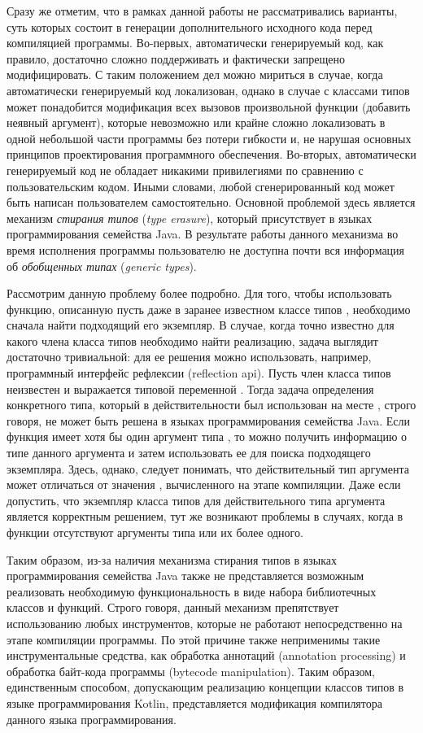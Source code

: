 Сразу же отметим, что в рамках данной работы не рассматривались варианты, суть которых состоит в генерации дополнительного исходного кода перед компиляцией программы. Во-первых, автоматически генерируемый код, как правило, достаточно сложно поддерживать и фактически запрещено модифицировать. С таким положением дел можно мириться в случае, когда автоматически генерируемый код локализован, однако в случае с классами типов может понадобится модификация всех вызовов произвольной функции (добавить неявный аргумент), которые невозможно или крайне сложно локализовать в одной небольшой части программы без потери гибкости и, не нарушая основных принципов проектирования программного обеспечения. Во-вторых, автоматически генерируемый код не обладает никакими привилегиями по сравнению с пользовательским кодом. Иными словами, любой сгенерированный код может быть написан пользователем самостоятельно. Основной проблемой здесь является механизм \emph{стирания типов} (\emph{type erasure}), который присутствует в языках программирования семейства Java. В результате работы данного механизма во время исполнения программы пользователю не доступна почти вся информация об \emph{обобщенных типах} (\emph{generic types}). 

Рассмотрим данную проблему более подробно. Для того, чтобы использовать функцию, описанную пусть даже в заранее известном классе типов , необходимо сначала найти подходящий его экземпляр. В случае, когда точно известно для какого члена класса типов  необходимо найти реализацию, задача выглядит достаточно тривиальной: для ее решения можно использовать, например, программный интерфейс рефлексии (reflection api). Пусть член класса типов неизвестен и выражается типовой переменной . Тогда задача определения конкретного типа, который в действительности был использован на месте , строго говоря, не может быть решена в языках программирования семейства Java. Если функция имеет хотя бы один аргумент типа , то можно получить информацию о типе данного аргумента и затем использовать ее для поиска подходящего экземпляра. Здесь, однако, следует понимать, что действительный тип аргумента может отличаться от значения , вычисленного на этапе компиляции. Даже если допустить, что экземпляр класса типов для действительного типа аргумента является корректным решением, тут же возникают проблемы в случаях, когда в функции отсутствуют аргументы типа  или их более одного.

Таким образом, из-за наличия механизма стирания типов в языках программирования семейства Java также не представляется возможным реализовать необходимую функциональность в виде набора библиотечных классов и функций. Строго говоря, данный механизм препятствует использованию любых инструментов, которые не работают непосредственно на этапе компиляции программы. По этой причине также неприменимы такие инструментальные средства, как обработка аннотаций (annotation processing) и обработка байт-кода программы (bytecode manipulation). Таким образом, единственным способом, допускающим реализацию концепции классов типов в языке программирования Kotlin, представляется модификация компилятора данного языка программирования. 